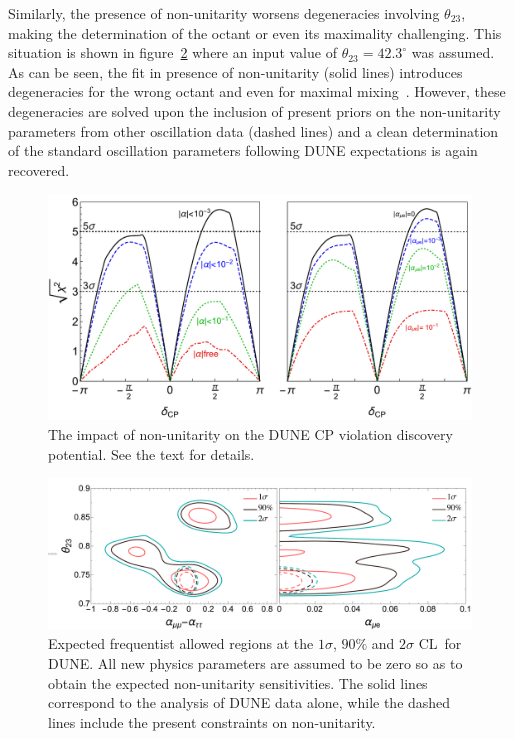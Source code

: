 Similarly, the presence of non-unitarity worsens degeneracies involving $\theta_{23}$, making the determination of the octant or even its maximality challenging.
This situation is shown in figure~\ref{fig:octant} where an input value of $\theta_{23} = 42.3^\circ$ was assumed. As can be seen, the fit in presence of non-unitarity (solid lines) introduces degeneracies for the wrong octant and even for maximal mixing~\cite{Blennow:2016jkn}. However, these degeneracies are solved upon the inclusion of present priors on the non-unitarity parameters from other oscillation data (dashed lines) and a clean determination of the standard oscillation parameters following DUNE expectations is again recovered.   

\begin{figure}[!t]
\centering
 \includegraphics[width=0.8\columnwidth]{graphics/cpsens-comb.pdf}
\caption{The impact of non-unitarity on the DUNE CP violation discovery potential. See the text for details.}
\label{fig:CPsens}
\end{figure}

\begin{figure}
 \includegraphics[width=0.8\columnwidth]{graphics/combined_pdf.pdf} 
 \begin{center}
  \caption{Expected frequentist allowed regions at the $1 \sigma$,
    $90\%$ and $2 \sigma$ CL\ for DUNE. All new physics parameters
    are assumed to be zero so as to obtain the expected
    non-unitarity sensitivities. The solid
    lines correspond to the analysis of DUNE data alone, while the
    dashed lines include the present constraints on non-unitarity.
\label{fig:octant}}
 \end{center}
\end{figure}

